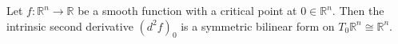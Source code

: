 Let $f: \mathbb{R}^n \to \mathbb{R}$ be a smooth function with a critical point at $0 \in \mathbb{R}^n$. Then the intrinsic second derivative $(d^2 f)_0$ is a symmetric bilinear form on $T_0 \mathbb{R}^n \cong \mathbb{R}^n$.
